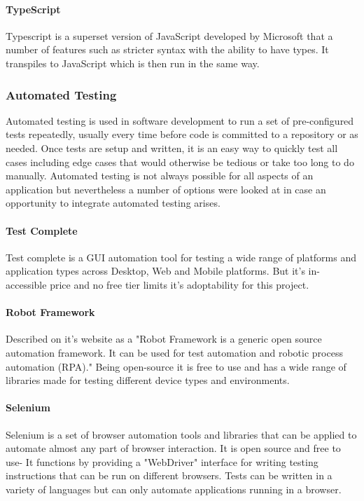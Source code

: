 \paragraph{TypeScript}
Typescript is a superset version of JavaScript developed by Microsoft that a number of features such as stricter syntax with the ability to have types. It transpiles to JavaScript which is then run in the same way. \cite[]{microsoft_typescript}

\subsubsection{Automated Testing}
Automated testing is used in software development to run a set of pre-configured tests repeatedly, usually every time before code is committed to a repository or as needed. Once tests are setup and written, it is an easy way to quickly test all cases including edge cases that would otherwise be tedious or take too long to do manually. Automated testing is not always possible for all aspects of an application but nevertheless a number of options were looked at in case an opportunity to integrate automated testing arises.

\paragraph{Test Complete}
Test complete is a GUI automation tool for testing a wide range of platforms and application types across Desktop, Web and Mobile platforms. \cite[]{smartbear_testcomplete}
But it's in-accessible price and no free tier limits it's adoptability for this project. \cite[]{smartbear_pricing}

\paragraph{Robot Framework}
Described on it's website as a "Robot Framework is a generic open source automation framework. It can be used for test automation and robotic process automation (RPA)." \cite[]{robotframework_robot} Being open-source it is free to use and has a wide range of libraries made for testing different device types and environments. \cite[]{robotframework_robot}

\paragraph{Selenium}
Selenium is a set of browser automation tools and libraries that can be applied to automate almost any part of browser interaction.
It is open source and free to use- It functions by providing a "WebDriver" interface for writing testing instructions that can be run on different browsers. Tests can be written
in a variety of languages but can only automate applications running in a browser. \cite[]{selenium_the}

